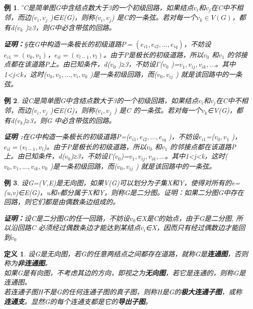 \documentclass[a4paper,11pt]{book}
\newtheorem{defination}{\textbf{定义}}[section]
\newtheorem{sample}{\textbf{例}}[section]
\begin{document}
\begin{sample}
\H 设C是简单图G中含结点数大于3的一个初级回路，如果结点$v_i$和$v_j$在C中不相邻，而边($v_i,v_j$ )∈E(G)，则称($v_i,v_j $) 是C的一条弦。若对每一个$v_k∈V(G)$，都有d($v_k$ )≥3，则G中必含带弦的回路。
\begin{adjustwidth}{0.62cm}{0.62cm}
\textbf{证明：}\S {在G中构造一条极长的初级道路$P=(e_{i1},e_{i2},\dots,e_{iq} )$，不妨设$e_{i1}=(v_0,v_1 )$，$e_{il}=(v_{l-1},v_l )$。由于P是极长的初级道路，所以$v_0$ 和$v_1$ 的邻接点都在该道路P上。由已知条件，d($v_0$ )≥3，不妨设Γ($v_0$ )={$v_1,v_{ij},v_{ik},\dots$}。其中1<j<k，这时($v_0,v_1,\dots,v_{i},v_0$ )是一条初级回路，而($v_0,v_{ij}$ ) 就是该回路中的一条弦。}
 \end{adjustwidth}
\end{sample}
\begin{sample}
设C是简单图G中含结点数大于3的一个初级回路，如果结点$v_i$和$v_j$在C中不相邻，而边($v_i,v_j$ )∈E(G)，则称($v_i,v_j$ ) 是C 的一条弦。若对每一个$v_k$∈V(G)，都有d($v_k$)≥3，则G 中必含带弦的回路。
\begin{adjustwidth}{0.62cm}{0.62cm}
\textbf{证明 :}在G中构造一条极长的初级道路P=($e_{i1},e_{i2},\dots,e_{iq}$ )，不妨设$e_{i1}$=($v_0,v_1$ )，$e_{il}=(v_{l-1},v_l $)。由于P是极长的初级道路，所以$v_0$ 和$v_1$ 的邻接点都在该道路P上。由已知条件，d($v_0$)≥3，不妨设Γ($v_0$)={$v_1,v_{ij},v_{ik},\dots$}。其中1<j<k，这时($v_0,v_1,\dots,v_{ik},v_0$ )是一条初级回路，而($v_0,v_{ij}$ ) 就是该回路中的一条弦。
\end{adjustwidth}
\end{sample}
\begin{sample}
设G=(V,E)是无向图，如果V(G)可以划分为子集X和Y，使得对所有的e=(u,v)∈E(G)，u和v都分属于X和Y，则称G是二分图。证明：如果二分图G中存在回路，则它们都是由偶数条边组成的。
\begin{adjustwidth}{0.62cm}{0.62cm}
\textbf{证明：}设C是二分图G的任一回路，不妨设$v_0$∈X是C的始点，由于G是二分图, 所以沿回路C 必须经过偶数条边才能达到某结点$v_i$∈X，因而只有经过偶数边才能回到$v_0$
\end{adjustwidth}
\end{sample}
\begin{defination}\K
 设G是无向图，若G的任意两结点之间都存在道路，就称G是\textbf{连通图}，否则称为\textbf{非连通图}。\\
 如果G是有向图，不考虑其边的方向，即视之为\textbf{无向图}，若它是连通的，则称G是连通图。\\
若连通子图H不是G的任何连通子图的真子图，则称H是G的\textbf{极大连通子图}，或称\textbf{连通支}。显然G的每个连通支都是它的\textbf{导出子图}。
\end{defination}
\end{document}
